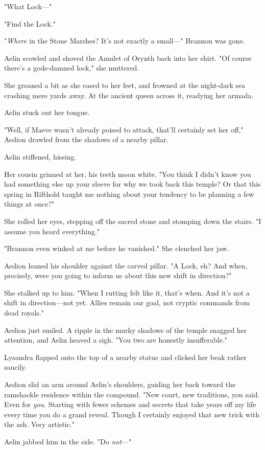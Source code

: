 "What Lock---"

"Find the Lock."

"\emph{Where} in the Stone Marshes?
It's not exactly a small---" Brannon was gone.

Aelin scowled and shoved the Amulet of Orynth back into her shirt.
"Of course there's a gods-damned lock," she muttered.

She groaned a bit as she eased to her feet, and frowned at the night-dark sea crashing mere yards away.
At the ancient queen across it, readying her armada.

Aelin stuck out her tongue.

"Well, if Maeve wasn't already poised to attack, that'll certainly set her off," Aedion drawled from the shadows of a nearby pillar.

Aelin stiffened, hissing.

Her cousin grinned at her, his teeth moon white.
"You think I didn't know you had something else up your sleeve for why we took back this temple?
Or that this spring in Rifthold taught me nothing about your tendency to be planning a few things at once?"

She rolled her eyes, stepping off the sacred stone and stomping down the stairs.
"I assume you heard everything."

"Brannon even winked at me before he vanished."
She clenched her jaw.

Aedion leaned his shoulder against the carved pillar.
"A Lock, eh?
And when, precisely, were you going to inform us about this new shift in direction?"

She stalked up to him.
"When I rutting felt like it, that's when.
And it's not a shift in direction---not yet.
Allies remain our goal, not cryptic commands from dead royals."

Aedion just smiled.
A ripple in the murky shadows of the temple snagged her attention, and Aelin heaved a sigh.
"You two are honestly insufferable."

Lysandra flapped onto the top of a nearby statue and clicked her beak rather saucily.

Aedion slid an arm around Aelin's shoulders, guiding her back toward the ramshackle residence within the compound.
"New court, new traditions, you said.
Even for \emph{you}.
Starting with fewer schemes and secrets that take years off my life every time you do a grand reveal.
Though I certainly enjoyed that new trick with the ash.
Very artistic."

Aelin jabbed him in the side.
"Do \emph{not}---"

